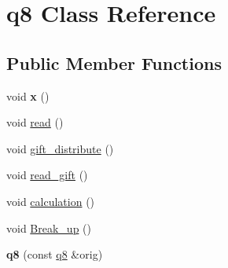 \hypertarget{classq8}{\section{q8 Class Reference}
\label{classq8}
}
\subsection*{Public Member Functions}
\begin{DoxyCompactItemize}
\item 
\hypertarget{classq8_a0426e32fcb48df8ccf21fac1f91fc486}{void {\bfseries x} ()}\label{classq8_a0426e32fcb48df8ccf21fac1f91fc486}

\item 
void \hyperlink{classq8_aa7dd079a3244b646a7ca1367bfeb9561}{read} ()
\item 
void \hyperlink{classq8_ac1cae87b53b695e6864318f8a988257f}{gift\-\_\-distribute} ()
\item 
void \hyperlink{classq8_ab209edd78bbe560c33e99d30ba9b0ee1}{read\-\_\-gift} ()
\item 
void \hyperlink{classq8_a13a868588961f1cd8c42a5f47a43efed}{calculation} ()
\item 
void \hyperlink{classq8_ad621b18c5fa2213ff562e063afd195cf}{Break\-\_\-up} ()
\item 
\hypertarget{classq8_a838fe9a9080ddfbe41784cdd79e30538}{{\bfseries q8} (const \hyperlink{classq8}{q8} \&orig)}\label{classq8_a838fe9a9080ddfbe41784cdd79e30538}

\end{DoxyCompactItemize}
